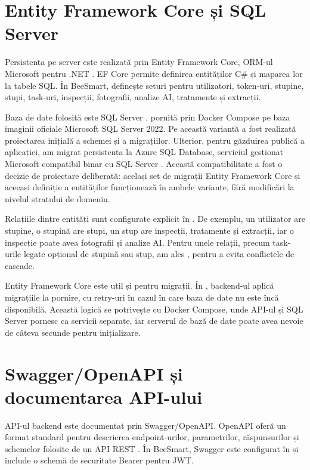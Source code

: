 \section{Entity Framework Core și SQL Server}

Persistența pe server este realizată prin Entity Framework Core, ORM-ul Microsoft pentru .NET \cite{efCoreDocs}. EF Core permite definirea entităților C\# și maparea lor la tabele SQL. În BeeSmart,  definește seturi pentru utilizatori, token-uri, stupine, stupi, task-uri, inspecții, fotografii, analize AI, tratamente și extracții.

Baza de date folosită este SQL Server \cite{sqlServerDocs}, pornită prin Docker Compose pe baza imaginii oficiale Microsoft SQL Server 2022. Pe această variantă a fost realizată proiectarea inițială a schemei și a migrațiilor. Ulterior, pentru găzduirea publică a aplicației, am migrat persistența la Azure SQL Database, serviciul gestionat Microsoft compatibil binar cu SQL Server \cite{azureSqlDocs}. Această compatibilitate a fost o decizie de proiectare deliberată: același set de migrații Entity Framework Core și aceeași definiție a entităților funcționează în ambele variante, fără modificări la nivelul stratului de domeniu.

Relațiile dintre entități sunt configurate explicit în . De exemplu, un utilizator are stupine, o stupină are stupi, un stup are inspecții, tratamente și extracții, iar o inspecție poate avea fotografii și analize AI. Pentru unele relații, precum task-urile legate opțional de stupină sau stup, am ales , pentru a evita conflictele de cascade.

Entity Framework Core este util și pentru migrații. În , backend-ul aplică migrațiile la pornire, cu retry-uri în cazul în care baza de date nu este încă disponibilă. Această logică se potrivește cu Docker Compose, unde API-ul și SQL Server pornesc ca servicii separate, iar serverul de bază de date poate avea nevoie de câteva secunde pentru inițializare.

\section{Swagger/OpenAPI și documentarea API-ului}

API-ul backend este documentat prin Swagger/OpenAPI. OpenAPI oferă un format standard pentru descrierea endpoint-urilor, parametrilor, răspunsurilor și schemelor folosite de un API REST \cite{swaggerSpec}. În BeeSmart, Swagger este configurat în  și include o schemă de securitate Bearer pentru JWT.


